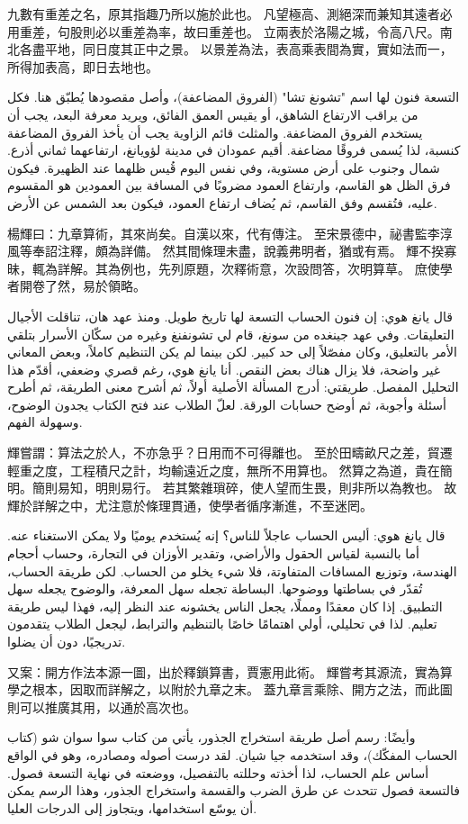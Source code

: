\documentclass[11pt,a4paper]{article}
\newcommand{\bilingualrow}[2]{%
\noindent\begin{minipage}[t]{0.48\textwidth}#1\end{minipage}\hfill\begin{minipage}[t]{0.48\textwidth}\arabicfont\beginR #2\endR\end{minipage}\par\vspace{0.5cm}}
\begin{document}
\bilingualrow{
九數有重差之名，原其指趣乃所以施於此也。
凡望極高、測絕深而兼知其遠者必用重差，句股則必以重差為率，故曰重差也。
立兩表於洛陽之城，令高八尺。南北各盡平地，同日度其正中之景。
以景差為法，表高乘表間為實，實如法而一，所得加表高，即日去地也。
}{
التسعة فنون لها اسم "تشونغ تشا" (الفروق المضاعفة)، وأصل مقصودها يُطبّق هنا.
فكل من يراقب الارتفاع الشاهق، أو يقيس العمق الفائق، ويريد معرفة البعد، يجب أن يستخدم الفروق المضاعفة. والمثلث قائم الزاوية يجب أن يأخذ الفروق المضاعفة كنسبة، لذا يُسمى فروقًا مضاعفة.
أقيم عمودان في مدينة لؤويانغ، ارتفاعهما ثماني أذرع. شمال وجنوب على أرض مستوية، وفي نفس اليوم قُيس ظلهما عند الظهيرة.
فيكون فرق الظل هو القاسم، وارتفاع العمود مضروبًا في المسافة بين العمودين هو المقسوم عليه، فتُقسم وفق القاسم، ثم يُضاف ارتفاع العمود، فيكون بعد الشمس عن الأرض.
}

\bilingualrow{
楊輝曰：九章算術，其來尚矣。自漢以來，代有傳注。
至宋景德中，祕書監李淳風等奉詔注釋，頗為詳備。
然其間條理未盡，說義弗明者，猶或有焉。
輝不揆寡昧，輒為詳解。其為例也，先列原題，次釋術意，次設問答，次明算草。
庶使學者開卷了然，易於領略。
}{
قال يانغ هوي: إن فنون الحساب التسعة لها تاريخ طويل. ومنذ عهد هان، تناقلت الأجيال التعليقات.
وفي عهد جينغده من سونغ، قام لي تشونفنغ وغيره من سكّان الأسرار بتلقي الأمر بالتعليق، وكان مفصّلاً إلى حد كبير.
لكن بينما لم يكن التنظيم كاملاً، وبعض المعاني غير واضحة، فلا يزال هناك بعض النقص.
أنا يانغ هوي، رغم قصري وضعفي، أقدّم هذا التحليل المفصل. طريقتي: أدرج المسألة الأصلية أولاً، ثم أشرح معنى الطريقة، ثم أطرح أسئلة وأجوبة، ثم أوضح حسابات الورقة.
لعلّ الطلاب عند فتح الكتاب يجدون الوضوح، وسهولة الفهم.
}

\bilingualrow{
輝嘗謂：算法之於人，不亦急乎？日用而不可得離也。
至於田疇畝尺之差，貿遷輕重之度，工程積尺之計，均輸遠近之度，無所不用算也。
然算之為道，貴在簡明。簡則易知，明則易行。
若其繁雜瑣碎，使人望而生畏，則非所以為教也。
故輝於詳解之中，尤注意於條理貫通，使學者循序漸進，不至迷罔。
}{
قال يانغ هوي: أليس الحساب عاجلاً للناس؟ إنه يُستخدم يوميًا ولا يمكن الاستغناء عنه.
أما بالنسبة لقياس الحقول والأراضي، وتقدير الأوزان في التجارة، وحساب أحجام الهندسة، وتوزيع المسافات المتفاوتة، فلا شيء يخلو من الحساب.
لكن طريقة الحساب، تُقدّر في بساطتها ووضوحها. البساطة تجعله سهل المعرفة، والوضوح يجعله سهل التطبيق.
إذا كان معقدًا ومملًا، يجعل الناس يخشونه عند النظر إليه، فهذا ليس طريقة تعليم.
لذا في تحليلي، أولي اهتمامًا خاصًا بالتنظيم والترابط، ليجعل الطلاب يتقدمون تدريجيًا، دون أن يضلوا.
}

\bilingualrow{
又案：開方作法本源一圖，出於釋鎖算書，賈憲用此術。
輝嘗考其源流，實為算學之根本，因取而詳解之，以附於九章之末。
蓋九章言乘除、開方之法，而此圖則可以推廣其用，以通於高次也。
}{
وأيضًا: رسم أصل طريقة استخراج الجذور، يأتي من كتاب سوا سوان شو (كتاب الحساب المفكّك)، وقد استخدمه جيا شيان.
لقد درست أصوله ومصادره، وهو في الواقع أساس علم الحساب، لذا أخذته وحللته بالتفصيل، ووضعته في نهاية التسعة فصول.
فالتسعة فصول تتحدث عن طرق الضرب والقسمة واستخراج الجذور، وهذا الرسم يمكن أن يوسّع استخدامها، ويتجاوز إلى الدرجات العليا.
}
\end{document}
